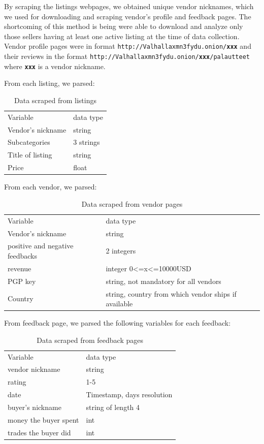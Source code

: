 \documentclass[
  digital, %
  table,   %
  lof,     %
  lot,     %
  oneside
]{fithesis3}
\begin{document}
By scraping the listings webpages, we obtained unique vendor nicknames,
which we used for downloading and scraping vendor's profile and feedback pages.
The shortcoming of this method is being were able to download and analyze only those sellers
having at least one active listing at the time of data collection. 
Vendor profile pages were in format \texttt{http://Valhallaxmn3fydu.onion/\textbf{xxx}}
and their reviews in the format
 \texttt{http://Valhallaxmn3fydu.onion/\textbf{xxx}/palautteet} where \texttt{\textbf{xxx}}
is a vendor nickname. 
 
From each listing, we parsed:

\begin{table}
    \caption{Data scraped from listings}
    \label{datalist}
    \begin{tabular}{|l|l|}
 Variable & data type\\
 Vendor's nickname & string\\
 Subcategories & 3 strings\\
 Title of listing & string\\
 Price & float\\
    \end{tabular}
\end{table}

From each vendor, we parsed:

\begin{table}
    \caption{Data scraped from vendor pages}
    \label{datavendor}
    \begin{tabular}{|l|l|}
 Variable & data type\\
Vendor's nickname & string\\
positive and negative feedbacks & 2 integers\\
revenue & integer 0<=x<=10000USD\\
PGP key & string, not mandatory for all vendors\\
Country & string, country from which vendor ships if available\\
    \end{tabular}
\end{table}

From feedback page, we parsed the following variables for each feedback:
\begin{table}
    \caption{Data scraped from feedback pages}
    \label{datafeedback}
    \begin{tabular}{|l|l|}
 Variable & data type\\
vendor nickname & string\\
rating & 1-5\\
date & Timestamp, days resolution\\
buyer's nickname & string of length 4\\
money the buyer spent & int\\
trades the buyer did & int\\
   
    \end{tabular}
\end{table}
\end{document}
